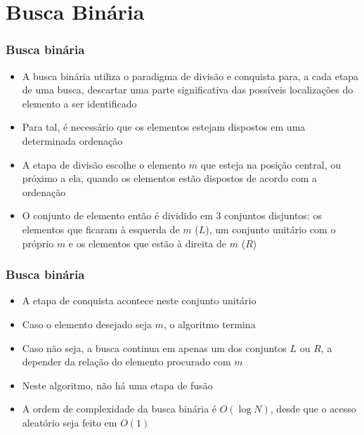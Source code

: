 \section{Busca Binária}

\begin{frame}[fragile]\frametitle{Busca binária}

    \begin{itemize}
        \item A busca binária utiliza o paradigma de divisão e conquista para, a cada etapa de
            uma busca, descartar uma parte significativa das possíveis localizações do elemento a
            ser identificado

        \item Para tal, é necessário que os elementos estejam dispostos em uma determinada 
            ordenação


        \item A etapa de divisão escolhe o elemento $m$ que esteja na posição central, ou próximo a
            ela, quando os elementos estão dispostos de acordo com a ordenação

        \item O conjunto de elemento então é dividido em 3 conjuntos disjuntos: os elementos que
            ficaram à esquerda de $m$ ($L$), um conjunto unitário com o próprio $m$ e os elementos
            que estão à direita de $m$ ($R$)
    \end{itemize}

\end{frame}

\begin{frame}[fragile]\frametitle{Busca binária}

    \begin{itemize}
        \item A etapa de conquista acontece neste conjunto unitário

        \item Caso o elemento desejado seja $m$, o algoritmo termina

        \item Caso não seja, a busca continua em apenas um dos conjuntos $L$ ou $R$, a depender
            da relação do elemento procurado com $m$

        \item Neste algoritmo, não há uma etapa de fusão

		\item A ordem de complexidade da busca binária é $O(\log N)$, desde que o acesso aleatório
            seja feito em $O(1)$
    \end{itemize}

\end{frame}

